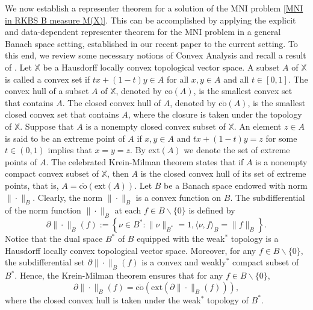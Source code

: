 \documentclass[11pt]{article}
\begin{document}
We now establish a representer theorem for a solution of the MNI problem \eqref{MNI in RKBS B measure M(X)}. This can be accomplished by applying the explicit and data-dependent  representer theorem for the MNI problem in a general Banach space setting, established in our recent paper \cite{wang2023sparse} to the current setting. To this end, we review some necessary notions of Convex Analysis and recall a result of  \cite{wang2023sparse}. %
Let $\mathbb{X}$ be a Hausdorff locally convex topological vector space. A subset $A$ of $\mathbb{X}$ is called a convex set if $t x+(1-t)y\in A$ for all $x,y\in A$ and all $t\in[0,1]$. The convex hull of a subset $A$ of  $\mathbb{X}$, denoted by $\mathrm{co}(A)$, is the smallest convex set that contains $A$. The closed convex hull of $A$, denoted by $\overline{\mathrm{co}}(A)$, is the smallest closed convex set that contains $A$, where the closure is taken under the topology of $\mathbb{X}$. Suppose that $A$ is a nonempty closed convex subset of $\mathbb{X}$. An element $z\in A$ is said to be an extreme point of $A$ if $x,y\in A$ and $tx+(1-t)y=z$ for some $t\in(0,1)$ implies that $x=y=z$. By $\mathrm{ext}(A)$ we denote the set of extreme points of $A$. The celebrated Krein-Milman theorem \cite{megginson2012introduction} states that if $A$ is a nonempty compact convex subset of $\mathbb{X}$, then $A$ is the closed convex hull of its set of extreme points, that is, 
$A=\overline{\mathrm{co}}\left(\mathrm{ext}(A)\right)$.
Let $B$ be a Banach space endowed with norm $\|\cdot\|_B$. Clearly, the norm $\|\cdot\|_B$ is a convex function on $B$. The subdifferential of the norm function $\|\cdot\|_B$ at each $f\in B\backslash\{0\}$ is defined by  \begin{equation*}\label{subdifferential = norming functional}
  \partial \|\cdot\|_B(f):=\left\{\nu\in B^*:\|\nu\|_{B^*}=1,\langle \nu,f\rangle_{B}=\|f\|_{B}\right\}.
\end{equation*}
Notice that the dual space $B^*$ of  $B$ equipped with the weak${}^*$ topology is a Hausdorff locally convex topological vector space. Moreover, for any $f\in B\backslash\{0\}$, the subdifferential set $\partial \|\cdot\|_B(f)$ is a convex and weakly${}^*$ compact subset of $B^*$. Hence, the Krein-Milman theorem ensures that for any $f\in B\backslash\{0\}$, 
\begin{equation*}\label{representation subdifferential set}
    \partial \|\cdot\|_B(f)=\overline{\mathrm{co}}(\mathrm{ext}(\partial \|\cdot\|_{B}(f))),
\end{equation*}
where the closed convex hull is taken under the weak$^*$ topology of $B^*$.
\end{document}
